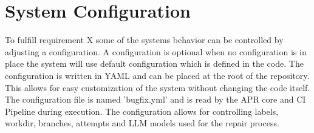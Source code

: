 \section{System Configuration}

To fulfill requirement X some of the systems behavior can be controlled by adjusting a configuration. A configuration is optional when no configuration is in place the system will use default configuration which is defined in the code. The configuration is written in YAML and can be placed at the root of the repository. This allows for easy customization of the system without changing the code itself. The configuration file is named 'bugfix.yml' and is read by the APR core and CI Pipeline during execution. The configuration allows for controlling labels, workdir, branches, attempts and LLM models used for the repair process.


